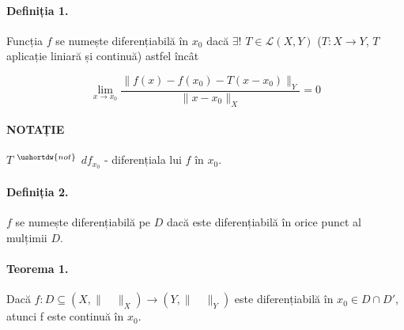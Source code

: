 \paragraph{Definiția 1.}
Funcția $f$ se numește diferențiabilă în $x_{0}$ dacă $\exists!$ $T \in \mathcal{L}(X, Y)$ ($T:X \rightarrow Y$, $T$ aplicație liniară și continuă) astfel încât

\begin{equation*}
\displaystyle\lim_{x \rightarrow x_{0}} \displaystyle\frac{\lVert f(x) - f(x_{0}) - T(x - x_{0}) \rVert_{Y}}{\lVert x - x_{0} \rVert_{X}} = 0
\end{equation*}

\paragraph{NOTAȚIE}
$T$ $^{\ushortdw{not}}$ $df_{x_{0}}$ - diferențiala lui $f$ în $x_{0}$.

\paragraph{Definiția 2.}
$f$ se numește diferențiabilă pe $D$ dacă este diferențiabilă în orice punct al mulțimii $D$.

\paragraph{Teorema 1.}
Dacă $f:D \subseteq (X, \lVert \quad \rVert_{X}) \rightarrow (Y, \lVert \quad \rVert_{Y})$ este diferențiabilă în $x_{0} \in D \cap D'$, atunci f este continuă în $x_{0}$.

